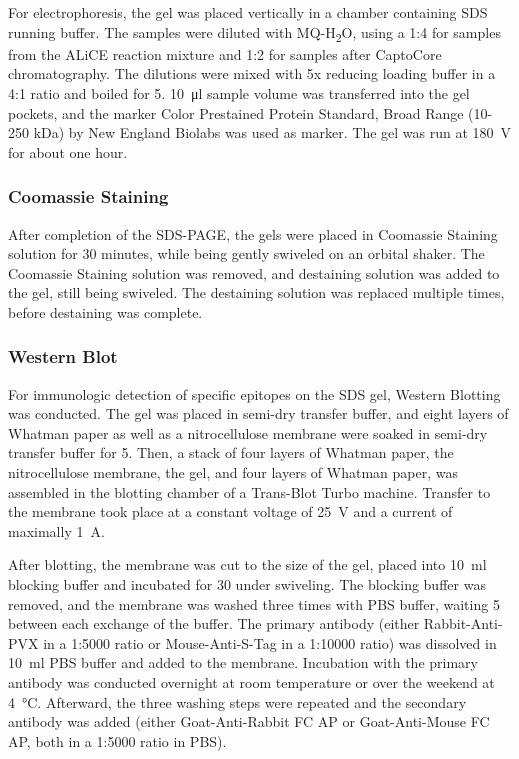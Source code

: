 For electrophoresis, the gel was placed vertically in a chamber containing SDS running buffer. The samples were diluted with MQ-H\textsubscript{2}O, using a 1:4 for samples from the ALiCE reaction mixture and 1:2 for samples after CaptoCore chromatography. The dilutions were mixed with 5x reducing loading buffer in a 4:1 ratio and boiled for \SI{5}{\min}. \SI{10}{\micro\litre} sample volume was transferred into the gel pockets, and the marker Color Prestained Protein Standard, Broad Range (10-250 kDa) by New England Biolabs was used as marker. The gel was run at \SI{180}{\volt} for about one hour. 

\subsubsection{Coomassie Staining}
After completion of the SDS-PAGE, the gels were placed in Coomassie Staining solution for 30 minutes, while being gently swiveled on an orbital shaker. The Coomassie Staining solution was removed, and destaining solution was added to the gel, still being swiveled. The destaining solution was replaced multiple times, before destaining was complete. 

\subsubsection{Western Blot}
For immunologic detection of specific epitopes on the SDS gel, Western Blotting was conducted. The gel was placed in semi-dry transfer buffer, and eight layers of Whatman paper as well as a nitrocellulose membrane were soaked in semi-dry transfer buffer for \SI{5}{\min}. Then, a stack of four layers of Whatman paper, the nitrocellulose membrane, the gel, and four layers of Whatman paper, was assembled in the blotting chamber of a Trans-Blot\textsuperscript{\textregistered} Turbo\textsuperscript{\texttrademark} machine. Transfer to the membrane took place at a constant voltage of \SI{25}{\volt} and a current of maximally \SI{1}{\ampere}.

After blotting, the membrane was cut to the size of the gel, placed into \SI{10}{\milli\litre} blocking buffer and incubated for \SI{30}{\min} under swiveling. The blocking buffer was removed, and the membrane was washed three times with PBS buffer, waiting \SI{5}{\min} between each exchange of the buffer. The primary antibody (either Rabbit-Anti-PVX in a 1:5000 ratio or Mouse-Anti-S-Tag in a 1:10000 ratio) was dissolved in \SI{10}{\milli\litre} PBS buffer and added to the membrane. Incubation with the primary antibody was conducted overnight at room temperature or over the weekend at \SI{4}{\degreeCelsius}. Afterward, the three washing steps were repeated and the secondary antibody was added (either Goat-Anti-Rabbit FC AP or Goat-Anti-Mouse FC AP, both in a 1:5000 ratio in PBS). 

